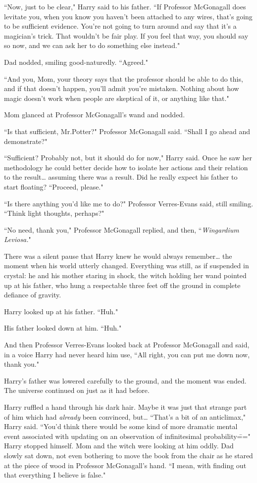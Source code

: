 ``Now, just to be clear," Harry said to his father. ``If Professor McGonagall does levitate you, when you know you haven't been attached to any wires, that's going to be sufficient evidence. You're not going to turn around and say that it's a magician's trick. That wouldn't be fair play. If you feel that way, you should say so now, and we can ask her to do something else instead."

Dad nodded, smiling good-naturedly. ``Agreed."

``And you, Mom, your theory says that the professor should be able to do this, and if that doesn't happen, you'll admit you're mistaken. Nothing about how magic doesn't work when people are skeptical of it, or anything like that."

Mom glanced at Professor McGonagall's wand and nodded.

``Is that sufficient, Mr.\?Potter?" Professor McGonagall said. ``Shall I go ahead and demonstrate?"

``Sufficient? Probably not, but it should do for now," Harry said. Once he saw her methodology he could better decide how to isolate her actions and their relation to the result{\ldots} assuming there was a result. Did he really expect his father to start floating? ``Proceed, please."

``Is there anything you'd like me to do?" Professor Verres-Evans said, still smiling. ``Think light thoughts, perhaps?"

``No need, thank you," Professor McGonagall replied, and then, ``\emph{Wingardium Leviosa.}"

There was a silent pause that Harry knew he would always remember{\ldots} the moment when his world utterly changed. Everything was still, as if suspended in crystal: he and his mother staring in shock, the witch holding her wand pointed up at his father, who hung a respectable three feet off the ground in complete defiance of gravity.

Harry looked up at his father. ``Huh."

His father looked down at him. ``Huh."

And then Professor Verres-Evans looked back at Professor McGonagall and said, in a voice Harry had never heard him use, ``All right, you can put me down now, thank you."

Harry's father was lowered carefully to the ground, and the moment was ended. The universe continued on just as it had before.

Harry ruffled a hand through his dark hair. Maybe it was just that strange part of him which had \emph{already} been convinced, but{\ldots} ``That's a bit of an anticlimax," Harry said. ``You'd think there would be some kind of more dramatic mental event associated with updating on an observation of infinitesimal probability\===" Harry stopped himself. Mom and the witch were looking at him oddly. Dad slowly sat down, not even bothering to move the book from the chair as he stared at the piece of wood in Professor McGonagall's hand. ``I mean, with finding out that everything I believe is false."

